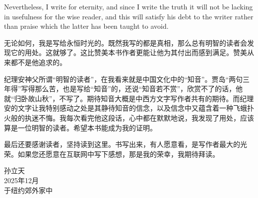 
\begin{bookquote}Nevertheless, I write for eternity, and since I write the truth it will not be lacking in usefulness for the wise reader, and this will satisfy his debt to the writer rather than praise which the latter has been taught to avoid.\end{bookquote}


\begin{bookquote}无论如何，我是写给永恒时光的。既然我写的都是真相，那么总有明智的读者会发现它的用处。这就够了。这比赞美本书作者更能让他为其付出而感到满足。赞美从来都不是他追求的。\end{bookquote}


纪理安神父所谓“明智的读者”，在我看来就是中国文化中的“知音”。贾岛“两句三年得”写得那么苦，也是写给“知音”的，还说“知音若不赏”，欣赏不了的话，他就“归卧故山秋”，不写了。期待知音大概是中西方文字写作者共有的期待。而纪理安的文字让我特别感动之处是其静待知音的信念，以及信念中又蕴含着一种飞蛾扑火般的执迷不悔。我每次看完他这段话，心中都在默默地说，我发现了用处，应该算是一位明智的读者。希望本书能成为我的证明。



最后还要感谢读者，坚持读到这里。书写出来，有人愿意看，是写作者最大的光荣。如果您还愿意在互联网中写下感想，那是我的荣幸，我期待拜读。



\begin{flushright}
孙立天\\[.5em]
2025年12月\\[.5em]
于纽约郊外家中
\end{flushright}
